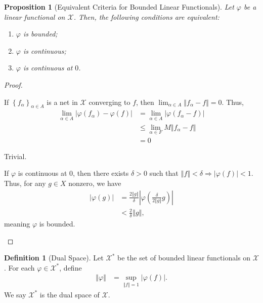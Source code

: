 \documentclass[10pt]{extarticle}
\newcommand{\norm}[1]{\left\Vert #1\right\Vert}
\newcommand{\set}[1]{\left\{#1\right\}}
\theoremstyle{plain}
\newtheorem*{proposition}{Proposition}
\theoremstyle{definition}
\newtheorem*{definition}{Definition}
\theoremstyle{note}
\begin{document}
\begin{proposition}[Equivalent Criteria for Bounded Linear Functionals]
Let $\varphi$ be a linear functional on $\mathcal{X}$. Then, the following conditions are equivalent:
\begin{enumerate}[(1)]
  \item $\varphi$ is bounded;
  \item $\varphi$ is continuous;
  \item $\varphi$ is continuous at $0$.
\end{enumerate}
\end{proposition}
\begin{proof}
  \begin{description}[font=\normalfont]
    \item[$(1)\Rightarrow (2)$:] If $\set{f_{\alpha}}_{\alpha \in A}$ is a net in $\mathcal{X}$ converging to $f$, then $\lim_{\alpha \in A}\norm{f_{\alpha} - f} = 0$. Thus,
      \begin{align*}
        \lim_{\alpha \in A}\left\vert \varphi\left(f_{\alpha}\right)-  \varphi\left(f\right) \right\vert &= \lim_{\alpha \in A}\left\vert \varphi(f_{\alpha} - f) \right\vert\\
                                                                                                         &\leq \lim_{\alpha \in F}M\norm{f_{\alpha} - f}\\
                                                                                                         &= 0
      \end{align*}
    \item[$(2)\Rightarrow (3)$:] Trivial.
    \item[$(3) \Rightarrow (1)$:] If $\varphi$ is continuous at $0$, then there exists $\delta > 0$ such that $\norm{f} < \delta \Rightarrow \left\vert \varphi(f) \right\vert < 1$. Thus, for any $g\in X$ nonzero, we have
      \begin{align*}
        \left\vert \varphi\left(g\right) \right\vert &= \frac{2\norm{g}}{\delta}\left\vert \varphi\left(\frac{\delta}{2\norm{g}}g\right) \right\vert\\
                                                     &< \frac{2}{\delta}\norm{g},
      \end{align*}
      meaning $\varphi$ is bounded.
  \end{description}
\end{proof}
\begin{definition}[Dual Space]
  Let $\mathcal{X}^{\ast}$ be the set of bounded linear functionals on $\mathcal{X}$. For each $\varphi \in \mathcal{X}^{\ast}$, define
  \begin{align*}
    \norm{\varphi} &= \sup_{\norm{f} = 1} \left\vert \varphi(f) \right\vert.
  \end{align*}
  We say $\mathcal{X}^{\ast}$ is the dual space of $\mathcal{X}$.
\end{definition}
\end{document}
